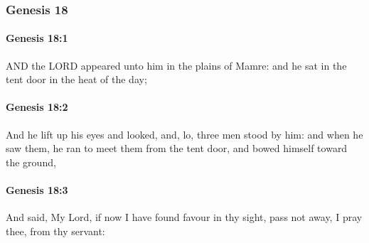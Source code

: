 	\subsubsection{Genesis 18} %
		\label{GENESIS-18}
		
		\paragraph{Genesis 18:1} %
			\label{GENESIS-18-1}

			AND the LORD appeared unto him in the plains of Mamre: and he sat in the tent door in the heat of the day;


		\paragraph{Genesis 18:2} %
			\label{GENESIS-18-2}

			And he lift up his eyes and looked, and, lo, three men stood by him: and when he saw them, he ran to meet them from the tent door, and bowed himself toward the ground,


		\paragraph{Genesis 18:3} %
			\label{GENESIS-18-3}

			And said, My Lord, if now I have found favour in thy sight, pass not away, I pray thee, from thy servant:

